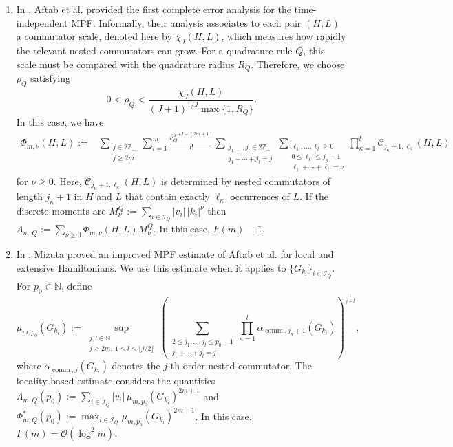 \documentclass[10pt,reqno]{article}
\numberwithin{equation}{section}
\theoremstyle{plain}
\theoremstyle{definition}
\begin{document}
\begin{enumerate} 

\item In \cite{aftab2024mpf}, Aftab et al. provided the first complete error analysis for the time-independent MPF. Informally, their analysis associates to each pair \((H,L)\) a commutator scale, denoted here by \(\chi_J(H,L)\), which measures how rapidly the relevant nested commutators can grow. For a quadrature rule \(Q\), this scale must be compared with the quadrature radius \(R_Q\). Therefore, we choose \(\rho_Q\) satisfying 
\begin{equation}
0<\rho_Q<\frac{\chi_J(H,L)}{(J+1)^{1/J}\max\{1,R_Q\}}.
\end{equation}
In this case, we have 
\begin{align} \Phi_{m,\nu}(H,L) :={}& \sum_{\substack{j\in 2\mathbb Z_+\\ j\ge 2m}} \sum_{l=1}^{m} \frac{\rho_Q^{\,j+l-(2m+1)}}{l!} \sum_{\substack{j_1,\dots,j_l\in 2\mathbb Z_+\\ j_1+\cdots+j_l=j}} \sum_{\substack{\ell_1,\dots,\ell_l\ge0\\ 0\le \ell_\kappa\le j_\kappa+1\\ \ell_1+\cdots+\ell_l=\nu}} \prod_{\kappa=1}^{l} 
\mathcal{C}_{j_\kappa+1,\ell_\kappa}(H,L)
\end{align} 
for \(\nu\ge0\). Here, \(\mathcal{C}_{j_\kappa+1,\ell_\kappa}(H,L)\) is determined by nested commutators of length \(j_\kappa+1\) in \(H\) and \(L\) that contain exactly \(\ell_\kappa\) occurrences of \(L\). If the discrete moments are $M_\nu^Q := \sum_{i\in\mathcal I_Q}|v_i|\,|k_i|^\nu$ then $\Lambda_{m,Q} := \sum_{\nu\ge0}\Phi_{m,\nu}(H,L)M_\nu^Q$. In this case, $F(m) \equiv 1$.

\item In \cite{mizuta2025commutatorscalinghamiltoniansimulation}, Mizuta proved an improved MPF estimate of Aftab et al. for local and extensive Hamiltonians. We use this estimate when it applies to \(\{G_{k_i}\}_{i\in\mathcal I_Q}\). For \(p_0\in\mathbb N\), define \begin{equation} \mu_{m,p_0}(G_{k_i}) := \sup_{\substack{j,l\in\mathbb N\\ j\ge 2m,\ 1\le l\le \lfloor j/2\rfloor}} \left( \sum_{\substack{2\le j_1,\ldots,j_l\le p_0-1\\ j_1+\cdots+j_l=j}} \prod_{\kappa=1}^{l} \alpha_{\operatorname{comm},j_\kappa+1}(G_{k_i}) \right)^{\frac{1}{j+l}}, \end{equation} where \(\alpha_{\operatorname{comm},j}(G_{k_i})\) denotes the \(j\)-th order nested-commutator.  The locality-based estimate considers the quantities $\Lambda_{m,Q}(p_0) := \sum_{i\in\mathcal I_Q} |v_i|\, \mu_{m,p_0}(G_{k_i})^{2m+1}$ and  $\Phi_{m,Q}^{\ast}(p_0) := \max_{i\in\mathcal I_Q} \mu_{m,p_0}(G_{k_i})^{2m+1}$.  In this case, $F(m) = \mathcal{O}(\log^2 m)$. \end{enumerate}
\end{document}
